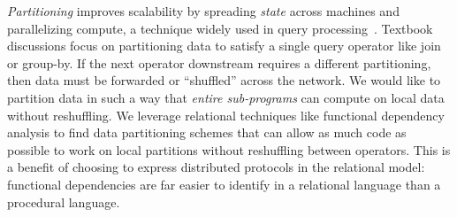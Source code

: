 \textit{Partitioning} improves scalability by spreading \textit{state} across machines and parallelizing compute, a technique widely used in query processing~\cite{gamma,grace}.
Textbook discussions focus on partitioning data to satisfy a single query operator like join or group-by.
If the next operator downstream requires a different partitioning, then data must be forwarded or ``shuffled'' across the network.
We would like to partition data in such a way that \emph{entire sub-programs} can compute on local data without reshuffling.
We leverage relational techniques like functional dependency analysis to find data partitioning schemes that can allow as much code as possible to work on local partitions without reshuffling between operators.
This is a benefit of choosing to express distributed protocols in the relational model:
functional dependencies are far easier to identify in a relational language than a procedural language.



